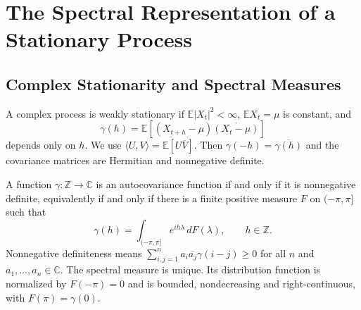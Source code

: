 \section{The Spectral Representation of a Stationary Process}

\subsection{Complex Stationarity and Spectral Measures}
\begin{definition}
A complex process is weakly stationary if $\mathbb E|X_t|^2<\infty$,
$\mathbb EX_t=\mu$ is constant, and
\[
\gamma(h)=\mathbb E[(X_{t+h}-\mu)\overline{(X_t-\mu)}]
\]
depends only on $h$. We use $\langle U,V\rangle=\mathbb E[U\overline V]$.
Then $\gamma(-h)=\overline{\gamma(h)}$ and the covariance matrices are
Hermitian and nonnegative definite.
\end{definition}
\begin{theorem}
\label{thm: herglotz}
A function $\gamma:\mathbb Z\to\mathbb C$ is an autocovariance function
if and only if it is nonnegative definite, equivalently if and only if there
is a finite positive measure $F$ on $(-\pi,\pi]$ such that
\[
\gamma(h)=\int_{(-\pi,\pi]}e^{ih\lambda}\,dF(\lambda),\qquad h\in\mathbb Z.
\]
Nonnegative definiteness means
$\sum_{i,j=1}^n a_i\overline{a_j}\gamma(i-j)\ge0$ for all $n$ and
$a_1,\ldots,a_n\in\mathbb C$.
The spectral measure is unique. Its distribution function is normalized by
$F(-\pi)=0$ and is bounded, nondecreasing and right-continuous, with
$F(\pi)=\gamma(0)$.
\end{theorem}
